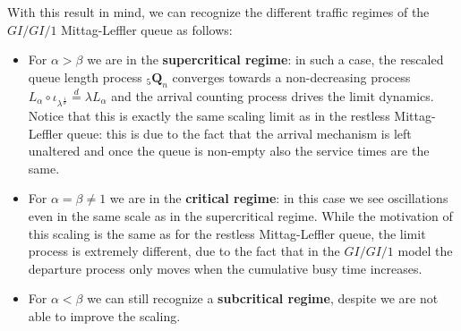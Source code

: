 \documentclass[]{amsart}
\numberwithin{equation}{section}
\theoremstyle{remark}
\theoremstyle{definition}
\begin{document}
With this result in mind, we can recognize the different traffic regimes of the $GI/GI/1$ Mittag-Leffler queue as follows:
\begin{itemize}
	\item For $\alpha>\beta$ we are in the \textbf{supercritical regime}: in such a case, the rescaled queue length process ${}_5\mathbf{Q}_n$ converges towards a non-decreasing process $L_\alpha \circ \iota_{\lambda^{\frac{1}{\alpha}}}\overset{d}{=} \lambda L_\alpha$ and the arrival counting process drives the limit dynamics. Notice that this is exactly the same scaling limit as in the restless Mittag-Leffler queue: this is due to the fact that the arrival mechanism is left unaltered and once the queue is non-empty also the service times are the same.
	\item For $\alpha=\beta \not = 1$ we are in the \textbf{critical regime}: in this case we see oscillations even in the same scale as in the supercritical regime. While the motivation of this scaling is the same as for the restless Mittag-Leffler queue, the limit process is extremely different, due to the fact that in the $GI/GI/1$ model the departure process only moves when the cumulative busy time increases. 	
	\item For $\alpha<\beta$ we can still recognize a \textbf{subcritical regime}, despite we are not able to improve the scaling. 
\end{itemize}
\end{document}
